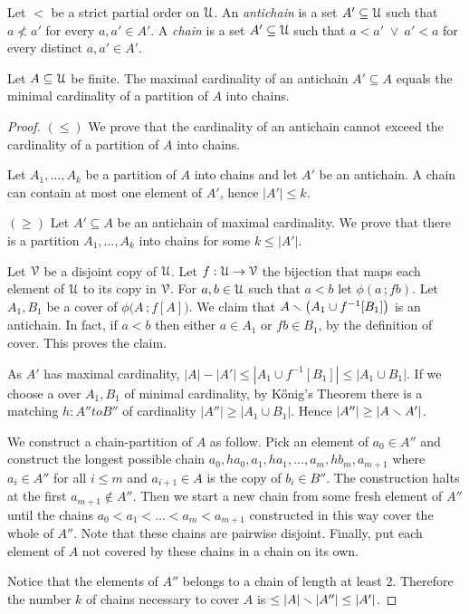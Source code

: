 \documentclass[scombinatorics.tex]{subfiles}
\begin{document}
Let $<$ be a strict partial order on $\EuScript U$.
An \emph{antichain\/} is a set $A'\subseteq\EuScript U$ such that $a\nless a'$ for every $a,a'\in A'$. A \emph{chain\/} is a set $A'\subseteq\EuScript U$ such that $a<a'\;\vee\ a'<a$ for every distinct $a,a'\in A'$.

\begin{void_thm}
  Let $A\subseteq\EuScript U$ be finite. 
  The maximal cardinality of an antichain $A'\subseteq A$ equals the minimal cardinality of a partition of $A$ into chains. 
\end{void_thm}

\begin{proof}
  {\boldmath$(\le)$}
  We prove that the cardinality of an antichain cannot exceed the cardinality of a partition of $A$ into chains.

  Let $A_1,\dots,A_k$ be a partition of $A$ into chains and let $A'$ be an antichain.
  A chain can contain at most one element of $A'$, hence $|A'|\le k$.

  {\boldmath$(\ge)$}  
  Let $A'\subseteq A$ be an antichain of maximal cardinality.
  We prove that there is a partition $A_1,\dots,A_k$ into chains for some $k\le|A'|$.


  Let $\EuScript V$ be a disjoint copy of $\EuScript U$.
  Let $f:\EuScript U\to\EuScript V$ the bijection that maps each element of $\EuScript U$ to its copy in $\EuScript V$.
  For $a,b\in\EuScript U$ such that $a<b$ let $\phi(a\,;fb)$.
  Let $A_1,B_1$ be a cover of $\phi\big(A\,;f[A]\big)$.
  We claim that $A \smallsetminus \big(A_1\cup f^{-1}[B_1]\big)$ is an antichain.
  In fact, if $a<b$ then either $a\in A_1$ or $fb\in B_1$, by the definition of cover.
  This proves the claim.

  As $A'$ has maximal cardinality, $|A| - |A'|\le |A_1\cup f^{-1}[B_1]|\le |A_1\cup B_1|$.
  If we choose a over $A_1,B_1$ of minimal cardinality, by K\H{o}nig's Theorem there is a matching $h:A''to B''$ of cardinality $|A''|\ge |A_1\cup B_1|$. Hence $|A''|\ge |A\smallsetminus A'|$.

  We construct a chain-partition of $A$ as follow.
  Pick an element of $a_0\in A''$ and construct the longest possible chain $a_0,ha_0,a_1,ha_1,\dots,a_m,hb_m,a_{m+1}$ where $a_i\in A''$ for all $i\le m$ and $a_{i+1}\in A$ is the copy of $b_i\in B''$.
  The construction halts at the first $a_{m+1}\not\in A''$.
  Then we start a new chain from some fresh element of $A''$ until the chains $a_0<a_1<\dots<a_m<a_{m+1}$ constructed in this way cover the whole of $A''$.
  Note that these chains are pairwise disjoint.
  Finally, put each element of $A$ not covered by these chains in a chain on its own.
  
  Notice that the elements of $A''$ belongs to a chain of length at least 2.
  Therefore the number $k$ of chains necessary to cover $A$ is $\le |A|\smallsetminus |A''| \le  |A'|$.
\end{proof}
\end{document}
